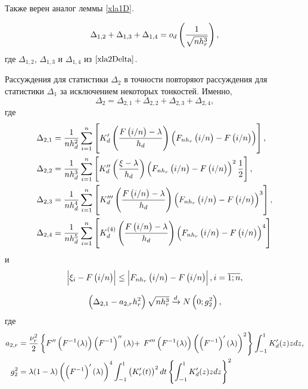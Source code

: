 \documentclass[a4paper,14pt,russian]{article}
\begin{document}
Также верен аналог леммы \eqref{xla1D}.
\begin{lemma}\label{xla2D}
$$
\Delta_{1,2}+ \Delta_{1,3}+ \Delta_{1,4}=o_d\left(\frac{1}{\sqrt{n h_r^3}}\right),
$$
где $\Delta_{1,2}$, $\Delta_{1,3}$ и $\Delta_{1,4}$ из $\eqref{xla2Delta}$.
\end{lemma}


Рассуждения для статистики  $\Delta_2$ в точности повторяют рассуждения для  статистики $\Delta_1$ за исключением некоторых тонкостей. Именно,
$$
\Delta_2 = \Delta_{2,1}+ \Delta_{2,2}+ \Delta_{2,3}+ \Delta_{2,4},
$$
где
\begin{align*}
& \Delta_{2,1}  =\frac{1}{n h_d^2}\sum_{i=1}^n \left[K_d'\left(\frac{F\left(i/n\right)-\lambda}{h_d}\right)\left(F_{n h_r}\left(i/n\right)-F\left(i/n\right)\right)\right]
,\\
& \Delta_{2,2}  = \frac{1}{n h_d^3}\sum_{i=1}^n
 \left[K_d''\left(\frac{\xi-\lambda}{h_d}\right)\left(F_{n h_r}\left(i/n\right)-F\left(i/n\right)\right)^2\frac{1}{2}\right],\\
 & \Delta_{2,3}  =\frac{1}{n h_d^4}\sum_{i=1}^n \left[K_d'''\left(\frac{F\left(i/n\right)-\lambda}{h_d}\right)\left(F_{n h_r}\left(i/n\right)-F\left(i/n\right)\right)^3\right]
,\\
 & \Delta_{2,4}  =\frac{1}{n h_d^5}\sum_{i=1}^n \left[K_d^{(4)}\left(\frac{F\left(i/n\right)-\lambda}{h_d}\right)\left(F_{n h_r}\left(i/n\right)-F\left(i/n\right)\right)^4\right]
\end{align*}
и
$$
 \left|\xi_i-F\left(i/n\right)\right| \leq \left|F_{n h_r}\left(i/n\right)-F\left(i/n\right)\right|, i=\overline{1;n},
$$
\begin{lemma}\label{xla2Delta2}
\begin{equation*}
\left(\Delta_{2,1} - a_{2,r}h_r^2\right) \sqrt{n h_r^3}  \xrightarrow{d} N\left(0;g_2^2\right),
\end{equation*}
где
\begin{align*}
a_{2,r} &=   \frac{\nu_r^2}{2}\left\{F''\left(F^{-1}(\lambda)\right)\left(F^{-1}\right)''(\lambda) +  \right.
 \left.F'''\left(F^{-1}(\lambda)\right)\left(\left(F^{-1}\right)'(\lambda)\right)^2\right\} \int _{-1}^1K'_d(z)zdz,\\
g_2^2 &= \lambda(1-\lambda)\left(\left(F^{-1}\right)'(\lambda)\right)^4 \int_{-1}^1 \left(K'_r(t)\right)^2dt \left\{\int_{-1}^1 K_d'(z)zdz\right\}^2
\end{align*}

\end{lemma}
\end{document}
